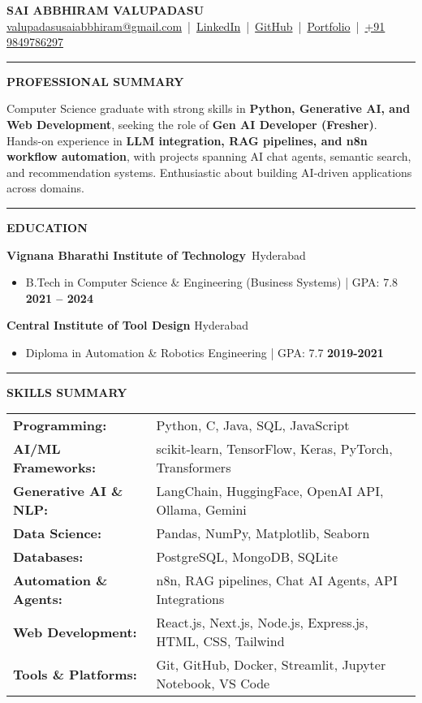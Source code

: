 \documentclass[11pt,a4paper]{article}
\newcommand{\resumesection}[1]{
	\vspace{0.2cm}
	\hrule
	\vspace{0.2cm}
	\centerline{\large\textbf{#1}}
	\vspace{0.15cm}
}
\begin{document}
	
	
	\noindent
	\begin{center}
		\textbf{\Huge SAI ABBHIRAM VALUPADASU} \\[0.3em]
		\href{mailto:valupadasusaiabbhiram@gmail.com}{valupadasusaiabbhiram@gmail.com} \,|\, 
		\href{https://www.linkedin.com/in/sai-abbhiram-valupadasu/}{LinkedIn} \,|\, 
		\href{https://github.com/ValupadasuSaiAbbhiram}{GitHub} \,|\, 
		\href{https://saiabbhiram-portfolio.vercel.app}{Portfolio} \,|\, 
		\href{tel:+919849786297}{+91 9849786297}
	\end{center}
	
	
	\resumesection{PROFESSIONAL SUMMARY}
	\noindent
	Computer Science graduate with strong skills in \textbf{Python, Generative AI, and Web Development}, seeking the role of \textbf{Gen AI Developer (Fresher)}. Hands-on experience in \textbf{LLM integration, RAG pipelines, and n8n workflow automation}, with projects spanning AI chat agents, semantic search, and recommendation systems. Enthusiastic about building AI-driven applications across domains.
	
	
	\resumesection{EDUCATION}
	\noindent \textbf{Vignana Bharathi Institute of Technology}\ \hfill Hyderabad
	\begin{itemize}
		\item B.Tech in Computer Science \& Engineering (Business Systems) | GPA: 7.8 \textbf{\hfill 2021 -- 2024}
	\end{itemize}
	
	\noindent \textbf{Central Institute of Tool Design} \hfill Hyderabad
	\begin{itemize}
		\item Diploma in Automation \& Robotics Engineering | GPA: 7.7 \textbf{\hfill 2019-2021}
	\end{itemize}
	
	
	\resumesection{SKILLS SUMMARY}
	\noindent \begin{tabularx}{\textwidth}{@{}lX@{}}
		\textbf{Programming:} & Python, C, Java, SQL, JavaScript \\
		\textbf{AI/ML Frameworks:} & scikit-learn, TensorFlow, Keras, PyTorch, Transformers \\
		\textbf{Generative AI \& NLP:} & LangChain, HuggingFace, OpenAI API, Ollama, Gemini \\
		\textbf{Data Science:} & Pandas, NumPy, Matplotlib, Seaborn \\
		\textbf{Databases:} & PostgreSQL, MongoDB, SQLite \\
		\textbf{Automation \& Agents:} & n8n, RAG pipelines, Chat AI Agents, API Integrations \\
		\textbf{Web Development:} & React.js, Next.js, Node.js, Express.js, HTML, CSS, Tailwind \\
		\textbf{Tools \& Platforms:} & Git, GitHub, Docker, Streamlit, Jupyter Notebook, VS Code \\
	\end{tabularx}
	
\end{document}
